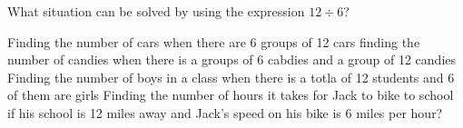 \documentclass{exam}
\begin{document}
\begin{questions}
\question What situation can be solved by using the expression $12 \div 6$?
\begin{choices}
	\choice Finding the number of cars when there are 6 groups of 12 cars
	\choice finding the number of candies when there is a groups of 6 cabdies and a group of 12 candies
	\choice Finding the number of boys in a class when there is a totla of 12 students and 6 of them are girls
	\choice Finding the number of hours it takes for Jack to bike to school if his school is 12 miles away and Jack's speed on his bike is 6 miles per hour?
	
\end{choices}

\end{questions}
\end{document}

